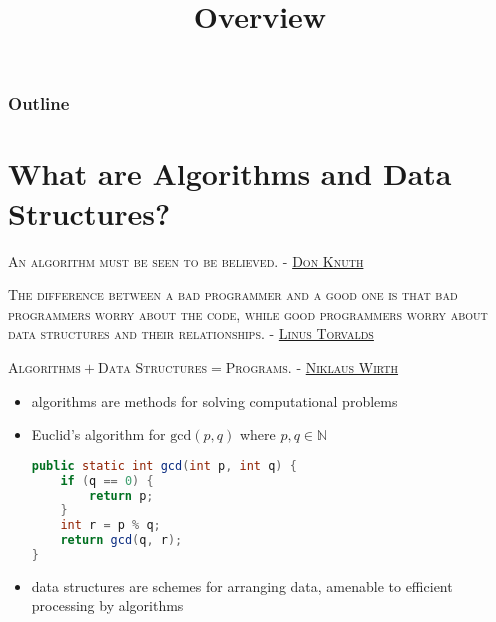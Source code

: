 \documentclass[8pt,a4paper,compress,handout]{beamer}
\title{Overview}
\date{}
\begin{document}
\begin{frame}
\vfill
\titlepage
\end{frame}

\begin{frame}
\frametitle{Outline}
\tableofcontents
\end{frame}

\section{What are Algorithms and Data Structures?}
\begin{frame}[fragile]
\begin{flushright}
\tiny \textsc{An algorithm must be seen to be believed. - \href{http://en.wikipedia.org/wiki/Donald_Knuth}{Don Knuth}}
\end{flushright}

\begin{flushright}
\tiny \textsc{The difference between a bad programmer and a good one is that bad programmers worry about the code, while good programmers worry about data structures and their relationships. - \href{http://en.wikipedia.org/wiki/Linus_Torvalds}{Linus Torvalds}}
\end{flushright}

\begin{flushright}
\tiny \textsc{$\text{Algorithms} + \text{Data Structures} = \text{Programs}$. - \href{http://en.wikipedia.org/wiki/Niklaus_Wirth}{Niklaus Wirth}}
\end{flushright}

\begin{itemize}
\item algorithms are methods for solving computational problems

\item Euclid's algorithm for $\text{gcd}(p, q)$ where $p, q \in \mathbb{N}$

\begin{lstlisting}[language=Java]
public static int gcd(int p, int q) {
    if (q == 0) {
        return p;
    }
    int r = p % q;
    return gcd(q, r);
}
\end{lstlisting}

\item data structures are schemes for arranging data, amenable to efficient processing by algorithms
\end{itemize}
\end{frame}
\end{document}
